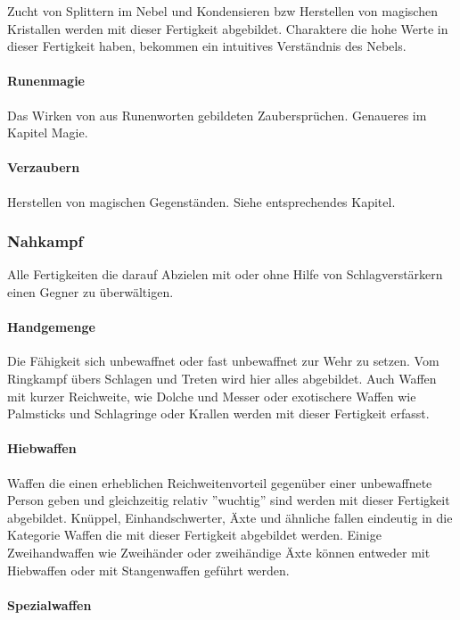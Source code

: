 \documentclass{article}
\begin{document}
Zucht von Splittern im Nebel und Kondensieren bzw Herstellen von magischen Kristallen werden mit dieser Fertigkeit
abgebildet. Charaktere die hohe Werte in dieser Fertigkeit haben, bekommen ein intuitives Verständnis des Nebels.

\paragraph{Runenmagie}

Das Wirken von aus Runenworten gebildeten Zaubersprüchen. Genaueres im Kapitel Magie.

\paragraph{Verzaubern}

Herstellen von magischen Gegenständen. Siehe entsprechendes Kapitel.

\subsubsection{Nahkampf}

Alle Fertigkeiten die darauf Abzielen mit oder ohne Hilfe von Schlagverstärkern einen Gegner zu überwältigen.

\paragraph{Handgemenge}
Die Fähigkeit sich unbewaffnet oder fast unbewaffnet zur Wehr zu setzen. Vom Ringkampf übers Schlagen und Treten
wird hier alles abgebildet. Auch Waffen mit kurzer Reichweite, wie Dolche und Messer oder exotischere Waffen wie
Palmsticks und Schlagringe oder Krallen werden mit dieser Fertigkeit erfasst.

\paragraph{Hiebwaffen}

Waffen die einen erheblichen Reichweitenvorteil gegenüber einer unbewaffnete Person geben und gleichzeitig relativ
''wuchtig'' sind werden mit dieser Fertigkeit abgebildet. Knüppel, Einhandschwerter, Äxte und ähnliche fallen
eindeutig in die Kategorie Waffen die mit dieser Fertigkeit abgebildet werden. Einige Zweihandwaffen wie
Zweihänder oder zweihändige Äxte können entweder mit Hiebwaffen oder mit Stangenwaffen geführt werden.

\paragraph{Spezialwaffen}
\end{document}
